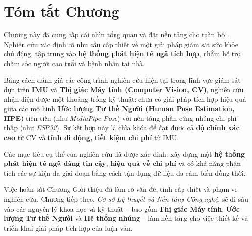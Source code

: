 
\section{Tóm tắt Chương}
\label{sec:chapter1_conclusion}

Chương này đã cung cấp cái nhìn tổng quan và đặt nền tảng cho toàn bộ \TENLUANVAN. Nghiên cứu xác định rõ nhu cầu cấp thiết về một giải pháp giám sát sức khỏe chủ động, tập trung vào \textbf{hệ thống phát hiện té ngã tích hợp}, nhằm hỗ trợ chăm sóc người cao tuổi và bệnh nhân tại nhà.

Bằng cách đánh giá các công trình nghiên cứu hiện tại trong lĩnh vực giám sát dựa trên \textbf{IMU} và \textbf{Thị giác Máy tính (Computer Vision, CV)}, nghiên cứu nhận diện được một khoảng trống kỹ thuật: chưa có giải pháp tích hợp hiệu quả giữa các mô hình \textbf{Ước lượng Tư thế Người (Human Pose Estimation, HPE)} tiên tiến (như \textit{MediaPipe Pose}) với nền tảng phần cứng nhúng chi phí thấp (như \textit{ESP32}). Sự kết hợp này là chìa khóa để đạt được cả \textbf{độ chính xác cao} từ CV và \textbf{tính di động, tiết kiệm chi phí} từ IMU.

Các mục tiêu cụ thể của nghiên cứu đã được xác định: xây dựng một \textbf{hệ thống phát hiện té ngã đáng tin cậy}, \textbf{hiệu quả về chi phí} và có khả năng phân tích các sự kiện đa giai đoạn bằng cách tận dụng dữ liệu đa cảm biến đồng thời.

Việc hoàn tất Chương Giới thiệu đã làm rõ vấn đề, tính cấp thiết và phạm vi nghiên cứu. Chương tiếp theo, \textit{Cơ sở Lý thuyết và Nền tảng Công nghệ}, sẽ đi sâu vào các nguyên lý khoa học và kỹ thuật – bao gồm \textbf{Thị giác Máy tính}, \textbf{Ước lượng Tư thế Người} và \textbf{Hệ thống nhúng} – làm nền tảng cho việc thiết kế và triển khai giải pháp tích hợp của luận văn.
